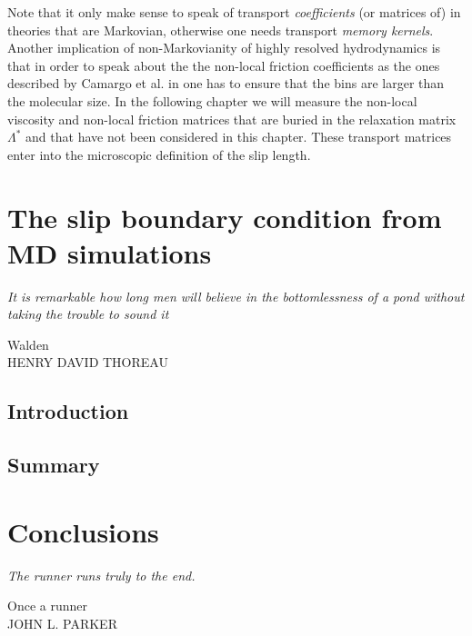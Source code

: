 \documentclass[b5paper,openright,11pt]{book}
\begin{document}
Note   that   it    only   make   sense   to    speak   of   transport
\textit{coefficients} (or matrices of) in theories that are Markovian,
otherwise  one  needs   transport  \textit{memory  kernels}.   Another
implication of  non-Markovianity of  highly resolved  hydrodynamics is
that in order  to speak about the the  non-local friction coefficients
as the ones  described by Camargo et al. in \cite{CamargoBC2018} one  has to ensure
that the  bins are larger  than the  molecular size. In  the following chapter we will  measure  the non-local  viscosity and  non-local
friction matrices that are buried in the relaxation matrix $\Lambda^*$
and  that  have  not  been  considered in  this chapter.  These
transport matrices enter  into the microscopic definition  of the slip
length.


\chapter{The slip boundary condition from MD simulations}
\label{Chap:Slip}
\epigraph{\textit{It is remarkable how long men will believe in the bottomlessness of a pond without taking the trouble to sound it}}{Walden \\ HENRY DAVID THOREAU}
\section{Introduction}

\section{Summary}

\chapter{Conclusions}\label{Chap:Conclusions}
\epigraph{\textit{The runner runs truly to the end.}}{Once a runner \\ JOHN L. PARKER}




\end{document}
